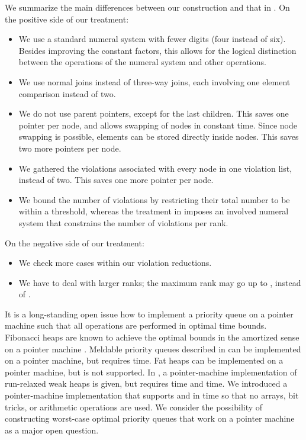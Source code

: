 \documentclass{llncs}
\newcommand{\Decrease}{\mbox{}}
\newcommand{\Meld}{\mbox{}}
\begin{document}
We summarize the main differences between our construction and that in
\cite{Bro96}.  On the positive side of our treatment:
\begin{itemize}

\item We use a standard numeral system with fewer digits (four instead
  of six).  Besides improving the constant factors, this allows for
  the logical distinction between the operations of
  the numeral system and other operations.

\item We use normal joins instead of three-way joins, each involving
  one element comparison instead of two.

\item We do not use parent pointers, except for the last children.
  This saves one pointer per node, and allows swapping of nodes in
  constant time. Since node swapping is possible, elements can be
  stored directly inside nodes. This saves two more pointers per node.

\item We gathered the violations associated with every node in one
  violation list, instead of two. This saves one more pointer per node.

\item We bound the number of violations by restricting their total
  number to be within a threshold, whereas the treatment
  in \cite{Bro96} imposes an involved numeral system that constrains
  the number of violations per rank.

\end{itemize}
\noindent
On the negative side of our treatment:
\begin{itemize}
\item We check more cases within our violation reductions.

\item We have to deal with larger ranks; the maximum rank may go up to
  , instead of .
\end{itemize}  


It is a long-standing open issue how to implement a priority queue on
a pointer machine such that all operations are performed in optimal
time bounds.  Fibonacci heaps are known to achieve the optimal bounds
in the amortized sense on a pointer machine \cite{KT08}. Meldable
priority queues described in \cite{Bro95} can be implemented on a pointer
machine, but \Decrease{} requires  time.  Fat heaps
\cite{KST02} can be implemented on a pointer machine, but \Meld{} is
not supported.  In \cite{EJK10c}, a pointer-machine implementation of
run-relaxed weak heaps is given, but \Meld{} requires  time
and \Decrease{}  time.  We introduced a pointer-machine
implementation that supports \Meld{} and \Decrease{} in 
time so that no arrays, bit tricks, or arithmetic operations are used.
We consider the possibility of constructing worst-case optimal
priority queues that work on a pointer machine as a major open question.
\end{document}
